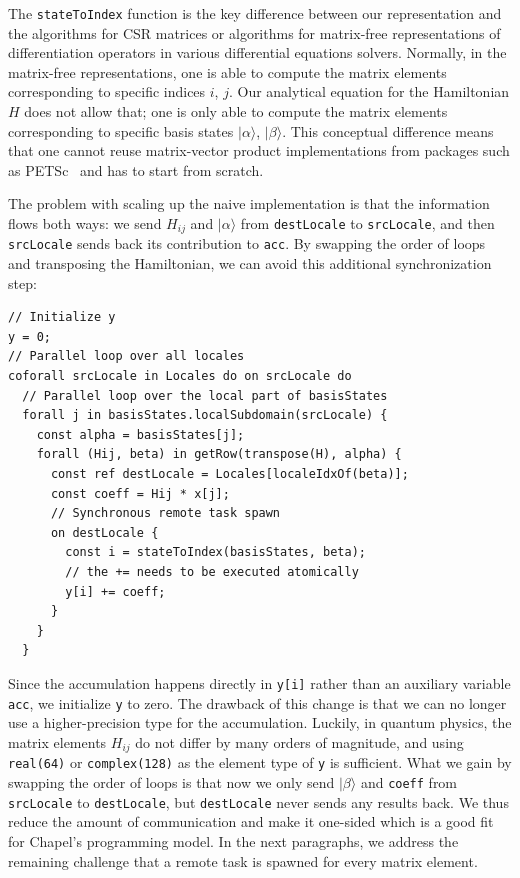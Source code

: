 The \verb|stateToIndex| function is the key difference between our representation and the algorithms for CSR matrices or algorithms for matrix-free representations of differentiation operators in various differential equations solvers. Normally, in the matrix-free representations, one is able to compute the matrix elements corresponding to specific indices $i$, $j$. Our analytical equation for the Hamiltonian $H$ does not allow that; one is only able to compute the matrix elements corresponding to specific basis states $|\alpha\rangle$, $|\beta\rangle$. This conceptual difference means that one cannot reuse matrix-vector product implementations from packages such as PETSc~\cite{Balay2023PetscWebPage} and has to start from scratch.

The problem with scaling up the naive implementation is that the information flows both ways: we send $H_{ij}$ and $|\alpha\rangle$ from \verb|destLocale| to \verb|srcLocale|, and then \verb|srcLocale| sends back its contribution to \verb|acc|. By swapping the order of loops and transposing the Hamiltonian, we can avoid this additional synchronization step:
\vspace{-0.2cm}
\begin{verbatim}
// Initialize y
y = 0;
// Parallel loop over all locales
coforall srcLocale in Locales do on srcLocale do
  // Parallel loop over the local part of basisStates
  forall j in basisStates.localSubdomain(srcLocale) {
    const alpha = basisStates[j];
    forall (Hij, beta) in getRow(transpose(H), alpha) {
      const ref destLocale = Locales[localeIdxOf(beta)];
      const coeff = Hij * x[j];
      // Synchronous remote task spawn
      on destLocale {
        const i = stateToIndex(basisStates, beta);
        // the += needs to be executed atomically
        y[i] += coeff;
      }
    }
  }
\end{verbatim}
\vspace{-0.2cm}

Since the accumulation happens directly in \verb|y[i]| rather than an auxiliary variable \verb|acc|, we initialize \verb|y| to zero. The drawback of this change is that we can no longer use a higher-precision type for the accumulation. Luckily, in quantum physics, the matrix elements $H_{ij}$ do not differ by many orders of magnitude, and using \verb|real(64)| or \verb|complex(128)| as the element type of \verb|y| is sufficient. What we gain by swapping the order of loops is that now we only send $|\beta\rangle$ and \verb|coeff| from \verb|srcLocale| to \verb|destLocale|, but \verb|destLocale| never sends any results back. We thus reduce the amount of communication and make it one-sided which is a good fit for Chapel's programming model. In the next paragraphs, we address the remaining challenge that a remote task is spawned for every matrix element.

